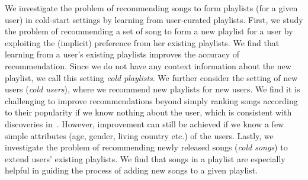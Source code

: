 %
We investigate the problem of recommending songs to form playlists (for a given user)
in cold-start settings by learning from user-curated playlists.
%
%
First, we study the problem of recommending a set of song to form a new playlist for a user
by exploiting the (implicit) preference %
from her existing playlists.
We find that learning from a user's existing playlists %
improves the accuracy of recommendation.
Since we do not have any context information about the new playlist, 
we call this setting \emph{cold playlists}.
%
We further consider the setting of new users (\ie \emph{cold users}),
where we recommend new playlists for new users.
We find it is challenging to improve recommendations beyond simply ranking songs according to their popularity 
if we know nothing about the user, which is consistent with discoveries 
in~\cite{mcfee2012million,bonnin2013evaluating,bonnin2015automated}.
However, improvement can still be achieved if we know a few simple attributes (\eg age, gender, living country etc.)
of the users.
%
%
%
Lastly, we investigate the problem of recommending newly released songs (\ie \emph{cold songs}) to extend users' existing playlists. 
We find that songs in a playlist are especially helpful in guiding the process of adding new songs to a given playlist.



